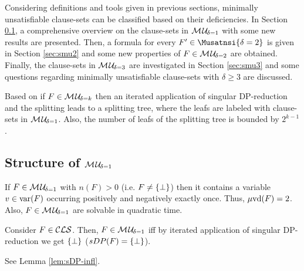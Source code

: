 \documentclass{report}
\begin{document}
Considering definitions and tools given in previous sections, minimally unsatisfiable clause-sets can be classified based on their deficiencies. In Section \ref{sec:smu1}, a comprehensive overview on the clause-sets in $\mathcal{M\hspace{0.8pt}U}_{\!\delta=1}$ with some new results are presented. Then, a formula for every $F' \in \Musatnsi{\delta=2}$ is given in Section \ref{sec:smu2} and some new properties of $F \in \mathcal{M\hspace{0.8pt}U}_{\!\delta=2}$ are obtained. Finally, the clause-sets in $ \mathcal{M\hspace{0.8pt}U}_{\!\delta=3}$ are investigated in Section \ref{sec:smu3} and some questions regarding minimally unsatisfiable clause-sets with $\delta \ge 3$ are discussed. 

\begin{lem}\label{lem:mu-refu-tree}
Based on \cite{KleineBuening2000SubclassesMU} if $F \in \mathcal{M\hspace{0.8pt}U}_{\!\delta=k}$ then an iterated application of singular DP-reduction and the splitting leads to a splitting tree, where the leafs are labeled with clause-sets in $\mathcal{M\hspace{0.8pt}U}_{\!\delta=1}$. Also, the number of leafs of the splitting tree is bounded by $2^{k-1}$.
\end{lem}
\subsection{Structure of $\mathcal{M\hspace{0.8pt}U}_{\!\delta=1}$}
\label{sec:smu1}

\begin{lem}\label{lem:mu1-uvd}
\cite{KleineBuening2000SubclassesMU} If $F \in \mathcal{M\hspace{0.8pt}U}_{\!\delta=1}$ with $n(F) > 0$ (i.e. $F \not = \{ \bot \}$) then it contains a variable $v \in \operatorname{var}(F)$ occurring positively and negatively exactly once. Thus, $\operatorname{\mu\!\operatorname{vd}}(F) = 2$. Also, $F \in \mathcal{M\hspace{0.8pt}U}_{\!\delta=1}$ are solvable in quadratic time.
\end{lem}

\begin{lem}\label{lem:mu1-sdp} Consider $F \in \mathcal{CLS}$. Then, $F \in \mathcal{M\hspace{0.8pt}U}_{\!\delta=1}$ iff by iterated application of singular DP-reduction we get $\{ \bot \}$ ($sDP(F) =\{ \bot \}$). 
\end{lem}
\begin{prf}
See Lemma \ref{lem:sDP-infl}.
\end{prf}
\end{document}
